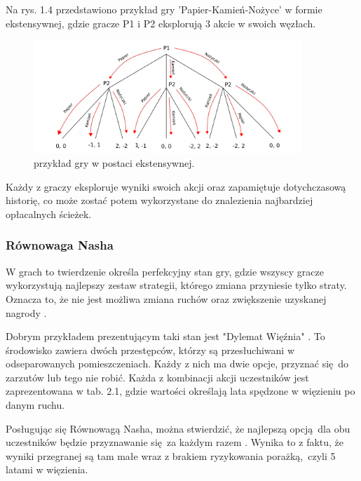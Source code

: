 \documentclass[12pt,oneside,a4paper]{report}
\begin{document}
Na rys. 1.4 przedstawiono przykład gry 'Papier-Kamień-Nożyce' w formie ekstensywnej, gdzie gracze P1 i
P2 eksplorują 3 akcie w swoich węzłach. 


\begin{figure}[th!]
            \center
           \includegraphics[width=0.9\textwidth]{./img/drawing1.pdf}
           \caption{przykład gry w postaci ekstensywnej.}
\end{figure}

Każdy z graczy eksploruje wyniki swoich akcji oraz zapamiętuje dotychczasową historię, co może zostać potem
wykorzystane do znalezienia najbardziej opłacalnych ścieżek.

\vspace{5cm}
\subsubsection{Równowaga Nasha}

W grach to twierdzenie określa perfekcyjny stan gry, gdzie wszyscy gracze wykorzystują najlepszy
zestaw strategii, którego zmiana przyniesie tylko straty. Oznacza to, że nie jest możliwa
zmiana ruchów oraz zwiększenie uzyskanej nagrody \cite{gt}. 

Dobrym przykładem prezentującym taki stan jest "Dylemat Więźnia" \cite{rn}. To środowisko zawiera 
dwóch przestępców, którzy są przesłuchiwani w odseparowanych pomieszczeniach. Każdy z nich ma dwie
opcje, przyznać się do zarzutów lub tego nie robić. Każda z kombinacji akcji uczestników jest
zaprezentowana w tab. 2.1, gdzie wartości określają lata spędzone w więzieniu po danym ruchu.


Posługując się Równowagą Nasha, można stwierdzić, że najlepszą opcją dla
obu uczestników będzie przyznawanie się za każdym razem \cite{rn}. Wynika to z faktu, że wyniki
przegranej są tam małe wraz z brakiem ryzykowania porażką, czyli 5 latami w więzienia.
\end{document}
